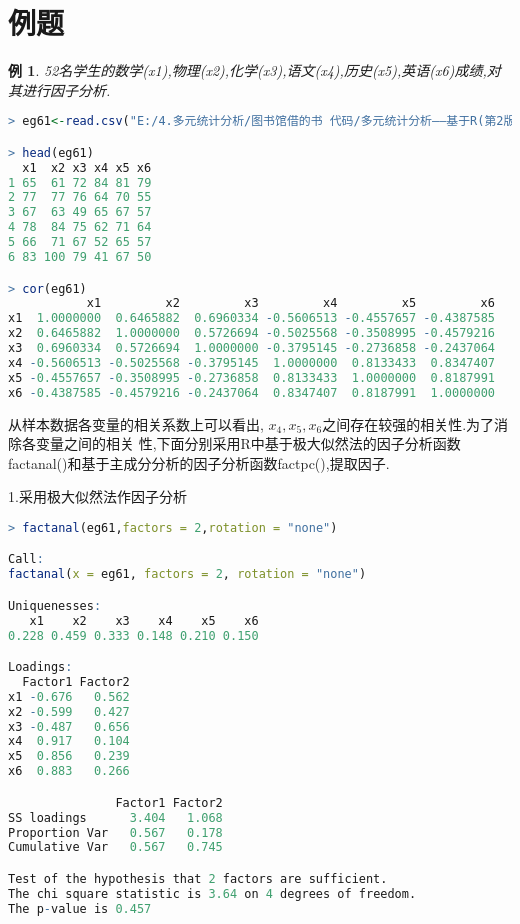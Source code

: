 \documentclass[11pt,a4paper,oneside]{book}
\newtheorem{e}{例}
\begin{document}
\section{例题}
\begin{e}
	52名学生的数学(x1),物理(x2),化学(x3),语文(x4),历史(x5),英语(x6)成绩,对其进行因子分析.
\end{e}

\begin{lstlisting}[language=r]
> eg61<-read.csv("E:/4.多元统计分析/图书馆借的书 代码/多元统计分析——基于R(第2版) R-data/eg6.1.csv")

> head(eg61)
  x1  x2 x3 x4 x5 x6
1 65  61 72 84 81 79
2 77  77 76 64 70 55
3 67  63 49 65 67 57
4 78  84 75 62 71 64
5 66  71 67 52 65 57
6 83 100 79 41 67 50

> cor(eg61)
           x1         x2         x3         x4         x5         x6
x1  1.0000000  0.6465882  0.6960334 -0.5606513 -0.4557657 -0.4387585
x2  0.6465882  1.0000000  0.5726694 -0.5025568 -0.3508995 -0.4579216
x3  0.6960334  0.5726694  1.0000000 -0.3795145 -0.2736858 -0.2437064
x4 -0.5606513 -0.5025568 -0.3795145  1.0000000  0.8133433  0.8347407
x5 -0.4557657 -0.3508995 -0.2736858  0.8133433  1.0000000  0.8187991
x6 -0.4387585 -0.4579216 -0.2437064  0.8347407  0.8187991  1.0000000
\end{lstlisting}

从样本数据各变量的相关系数上可以看出, $ x_4,x_5,x_6 $之间存在较强的相关性.为了消除各变量之间的相关
性,下面分别采用R中基于极大似然法的因子分析函数factanal()和基于主成分分析的因子分析函数factpc(),提取因子.

1.采用极大似然法作因子分析
\begin{lstlisting}[language=r]
> factanal(eg61,factors = 2,rotation = "none")

Call:
factanal(x = eg61, factors = 2, rotation = "none")

Uniquenesses:
   x1    x2    x3    x4    x5    x6 
0.228 0.459 0.333 0.148 0.210 0.150 

Loadings:
  Factor1 Factor2
x1 -0.676   0.562 
x2 -0.599   0.427 
x3 -0.487   0.656 
x4  0.917   0.104 
x5  0.856   0.239 
x6  0.883   0.266 

               Factor1 Factor2
SS loadings      3.404   1.068
Proportion Var   0.567   0.178
Cumulative Var   0.567   0.745

Test of the hypothesis that 2 factors are sufficient.
The chi square statistic is 3.64 on 4 degrees of freedom.
The p-value is 0.457
\end{lstlisting}
\end{document}
